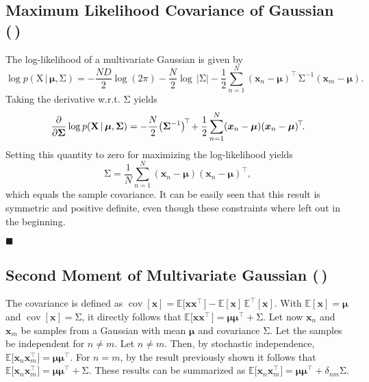 \documentclass[11pt, a4paper]{scrartcl}
\newcommand{\E}{\mathbb{E}}
\DeclareMathOperator{\cov}{cov}
\newcommand{\transposed}{{\!\top\!}}
\renewcommand{\vec}[1]{\bm{#1}}
\newcommand{\mat}[1]{\bm{\mathrm{#1}}}
\newcommand{\given}{\,\vert\,}
\newcommand{\eot}{\hfill\(\blacksquare\)}
\newcommand{\diffstar}{\texorpdfstring{\raisebox{-1pt}{\resizebox{!}{8pt}{\(\star\)}}}{*}}
\newcommand{\twostar}  {(\diffstar\,\diffstar)}
\begin{document}
		\subsection{Maximum Likelihood Covariance of Gaussian  \twostar}
			The log-likelihood of a multivariate Gaussian is given by
			\begin{equation}
				\log p(\mat{X} \given \vec{\mu}, \mat{\Sigma}) = -\frac{ND}{2} \log(2\pi) - \frac{N}{2} \log \, \lvert \mat{\Sigma} \rvert - \frac{1}{2} \sum_{n = 1}^{N} (\vec{x}_n - \vec{\mu})^\transposed\, \mat{\Sigma}^{-1} (\vec{x}_m - \vec{\mu}).
			\end{equation}
			Taking the derivative w.r.t. \( \mat{\Sigma} \) yields
			\begin{equation}
				\pdv{\mat{\Sigma}} \log p(\mat{X} \given \vec{\mu}, \mat{\Sigma})
					= -\frac{N}{2} \big( \mat{\Sigma}^{-1} \big)^\transposed + \frac{1}{2} \sum_{n = 1}^{N} (\vec{x}_n - \vec{\mu}) (\vec{x}_n - \vec{\mu})^\transposed.
			\end{equation}
			Setting this quantity to zero for maximizing the log-likelihood yields
			\begin{equation}
				\mat{\Sigma} = \frac{1}{N} \sum_{n = 1}^{N} (\vec{x}_n - \vec{\mu}) (\vec{x}_n - \vec{\mu})^\transposed,
			\end{equation}
			which equals the sample covariance. It can be easily seen that this result is symmetric and positive definite, even though these constraints where left out in the beginning.

			\eot

		\subsection{Second Moment of Multivariate Gaussian  \twostar}
			The covariance is defined as \( \cov[\vec{x}] = \E\big[ \vec{x} \vec{x}^{\transposed\,} \big] - \E[\vec{x}] \, \E^\transposed[\vec{x}] \). With \( \E[\vec{x}] = \vec{\mu} \) and \( \cov[\vec{x}] = \mat{\Sigma} \), it directly follows that \( \E\big[ \vec{x} \vec{x}^{\transposed\,} \big] = \vec{\mu} \vec{\mu}^\transposed + \mat{\Sigma} \). Let now \( \vec{x}_n \) and \( \vec{x}_m \) be samples from a Gaussian with mean \( \vec{\mu} \) and covariance \( \mat{\Sigma} \). Let the samples be independent for \( n \neq m \). Let \( n \neq m \). Then, by stochastic independence, \( \E\big[ \vec{x}_n \vec{x}_m^{\transposed\,} \big] = \vec{\mu} \vec{\mu}^\transposed \). For \( n = m \), by the result previously shown it follows that \( \E\big[ \vec{x}_n \vec{x}_m^{\transposed\,} \big] = \vec{\mu} \vec{\mu}^\transposed + \mat{\Sigma} \). These results can be summarized as \( \E\big[ \vec{x}_n \vec{x}_m^{\transposed\,} \big] = \vec{\mu} \vec{\mu}^\transposed + \delta_{nm} \mat{\Sigma} \).
\end{document}
